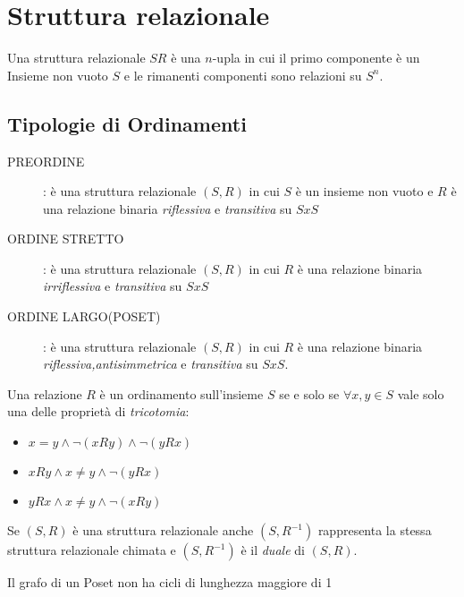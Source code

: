 \section{Struttura relazionale}
Una struttura relazionale $SR$ è una $n$-upla in cui il primo componente è un Insieme
non vuoto $S$ e le rimanenti componenti sono relazioni su $S^n$.

\subsection{Tipologie di Ordinamenti}
\begin{description}
    \item[PREORDINE]: è una struttura relazionale $(S,R)$ in cui $S$ è un insieme non vuoto
          e $R$ è una relazione binaria \emph{riflessiva} e \emph{transitiva} su $S x S$
    \item[ORDINE STRETTO]: è una struttura relazionale $(S,R)$ in cui $R$ è una
          relazione binaria \emph{irriflessiva} e \emph{transitiva} su $S x S$
    \item[ORDINE LARGO(POSET)]: è una struttura relazionale $(S,R)$ in cui $R$ è una
          relazione binaria \emph{riflessiva,antisimmetrica} e \emph{transitiva} su $S x S$.
\end{description}

Una relazione $R$ è un ordinamento sull'insieme $S$ se e solo se $\forall x,y \in S$
vale solo una delle proprietà di \emph{tricotomia}:
\begin{itemize}
    \item $x = y \land \neg(xRy) \land \neg(yRx)$
    \item $xRy \land x \neq y \land \neg(yRx)$
    \item $yRx \land x \neq y \land \neg(xRy)$
\end{itemize}

\begin{prop}
Se $(S,R)$ è una struttura relazionale anche $(S,R^{-1})$ rappresenta la stessa
struttura relazionale chimata e $(S,R^{-1})$ è il \emph{duale} di $(S,R)$.
\end{prop}


\begin{prop}
Il grafo di un Poset non ha cicli di lunghezza maggiore di 1
\end{prop}



